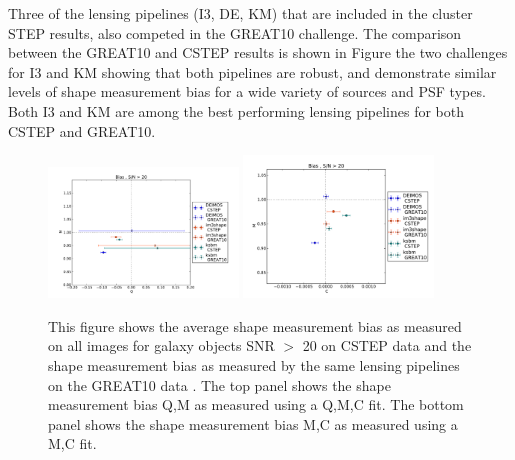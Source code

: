 Three of the lensing pipelines (I3, DE, KM) that are included in the
cluster STEP results, also competed in the GREAT10 challenge.
The comparison between the GREAT10 and CSTEP results is shown in 
Figure %
the two challenges for I3 and KM showing that both pipelines are 
robust, and demonstrate similar levels of shape measurement bias
for a wide variety of sources and PSF types. Both I3 and KM are 
among the best performing lensing pipelines for both CSTEP and
GREAT10. 

\begin{figure}
 \centering  %
  \includegraphics[width=0.45\textwidth]{fig/QMC_gt10.pdf} 
  \includegraphics[width=0.45\textwidth]{fig/MC_gt10.pdf} 
  \caption{This figure shows the average shape measurement bias
as measured on all images for galaxy objects SNR $>$ 20 on
CSTEP data and the shape measurement bias as measured by the
same lensing pipelines on the GREAT10 data \citep{GREAT10}. The
top panel shows the shape measurement bias Q,M as measured using 
a Q,M,C fit. The bottom panel shows the shape measurement bias 
M,C as measured using a M,C fit.}
\label{fig:gt10}
\end{figure}

